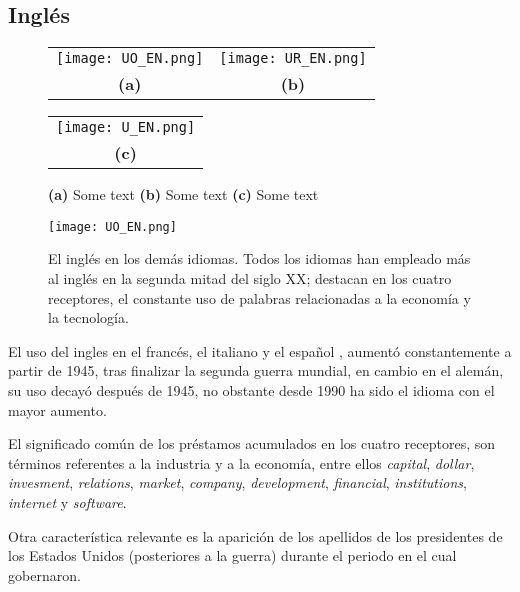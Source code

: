 \subsection{Inglés} %



\begin{figure}
	\centering
	\begin{tabular}{cc}
		\texttt{[image: UO\_EN.png]} &
		\texttt{[image: UR\_EN.png]}  \\
		\textbf{(a)}  & \textbf{(b)} 
	\end{tabular}

	\begin{tabular}{c}
		\texttt{[image: U\_EN.png]} \\
		\textbf{(c)}
	\end{tabular}
	\caption{ 
		\textbf{(a)} Some text
		\textbf{(b)} Some text
		\textbf{(c)} Some text}
	\label{U_EN}
\end{figure}


\begin{figure}%
	\centering
	\texttt{[image: UO\_EN.png]}
	\label{fig.ST_a_EN}
	\caption{El inglés en los demás idiomas. Todos los idiomas han empleado más al inglés en la segunda mitad del siglo XX; destacan en los cuatro receptores, el constante uso de palabras relacionadas a la economía y la tecnología.}
\end{figure} 



El uso del ingles en el francés, el italiano y el español , aumentó constantemente a partir de 1945, tras finalizar la segunda guerra mundial, en cambio en el alemán, su uso decayó después de 1945, no obstante desde 1990 ha sido el idioma con el mayor aumento.

El significado común de los préstamos acumulados  en los cuatro receptores,  son términos referentes a la industria  y a la economía, entre ellos \textit{capital}, \textit{dollar}, \textit{invesment}, \textit{relations}, \textit{market}, \textit{company}, \textit{development}, \textit{financial},  \textit{institutions}, \textit{internet} y \textit{software}. 

Otra característica relevante es la aparición de los apellidos de los presidentes de los Estados Unidos (posteriores a la guerra) durante el periodo en el cual gobernaron. 


